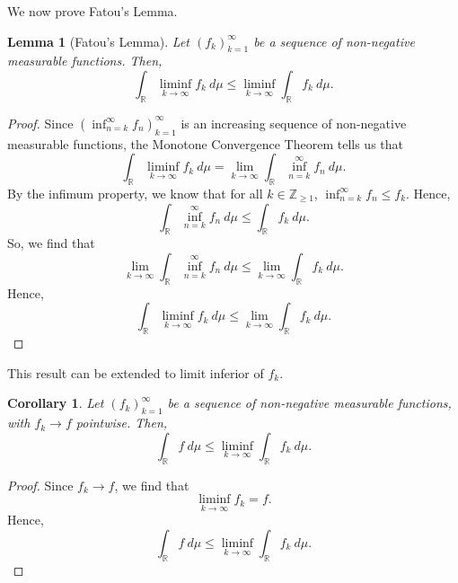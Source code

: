 \documentclass[a4paper, openany]{memoir}
\theoremstyle{definition}
\theoremstyle{plain}
\newtheorem{lemma}[definition]{Lemma}
\newtheorem{corollary}[definition]{Corollary}
\begin{document}
    We now prove Fatou's Lemma.
    \begin{lemma}[Fatou's Lemma]
        Let $(f_k)_{k=1}^\infty$ be a sequence of non-negative measurable functions. Then,
        \[\int_{\mathbb{R}} \liminf_{k \to \infty} f_k \ d\mu \leq \liminf_{k \to \infty} \int_{\mathbb{R}} f_k \ d\mu.\]
    \end{lemma}
    \begin{proof}
        Since $(\inf_{n=k}^\infty f_n)_{k=1}^\infty$ is an increasing sequence of non-negative measurable functions, the Monotone Convergence Theorem tells us that 
        \[\int_{\mathbb{R}} \liminf_{k \to \infty} f_k \ d\mu = \lim_{k \to \infty} \int_{\mathbb{R}} \inf_{n=k}^\infty f_n \ d\mu.\]
        By the infimum property, we know that for all $k \in \mathbb{Z}_{\geq 1}$, $\inf_{n=k}^\infty f_n \leq f_k$. Hence,
        \[\int_{\mathbb{R}} \inf_{n=k}^\infty f_n \ d\mu \leq \int_{\mathbb{R}} f_k \ d\mu.\]
        So, we find that
        \[\lim_{k \to \infty} \int_{\mathbb{R}} \inf_{n=k}^\infty f_n \ d\mu \leq \lim_{k \to \infty} \int_{\mathbb{R}} f_k \ d\mu.\]
        Hence,
        \[\int_{\mathbb{R}} \liminf_{k \to \infty} f_k \ d\mu \leq \lim_{k \to \infty} \int_{\mathbb{R}} f_k \ d\mu.\]
    \end{proof}
    \noindent This result can be extended to limit inferior of $f_k$.
    \begin{corollary}
        Let $(f_k)_{k=1}^\infty$ be a sequence of non-negative measurable functions, with $f_k \to f$ pointwise. Then,
        \[\int_{\mathbb{R}} f \ d\mu \leq \liminf_{k \to \infty} \int_{\mathbb{R}} f_k \ d\mu.\]
    \end{corollary}
    \begin{proof}
        Since $f_k \to f$, we find that
        \[\liminf_{k \to \infty} f_k = f.\]
        Hence,
        \[\int_{\mathbb{R}} f \ d\mu \leq \liminf_{k \to \infty} \int_{\mathbb{R}} f_k \ d\mu.\]
    \end{proof}
\end{document}
